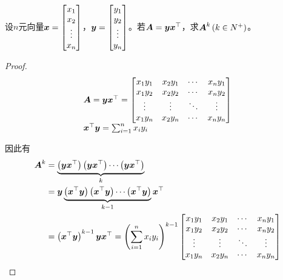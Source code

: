 \begin{problem}\label{problem-1.12}
设\(n\)元向量\(\boldsymbol{x}=\begin{bmatrix}x_1\\x_2\\\vdots\\x_n\end{bmatrix}\)，\(\boldsymbol{y}=\begin{bmatrix}y_1\\y_2\\\vdots\\y_n\end{bmatrix}\)。若\(\boldsymbol{A}=\boldsymbol{y}\boldsymbol{x}^\top\)，求\(\boldsymbol{A}^k\left( k \in N^+ \right)\)。
\end{problem}
\begin{proof}
    \begin{equation*}
        \begin{array}{lll}
            \boldsymbol{A}=\boldsymbol{y}\boldsymbol{x}^\top=
            \begin{bmatrix}
                x_1y_1 & x_2y_1 & \cdots & x_ny_1 \\
                x_1y_2 & x_2y_2 & \cdots & x_ny_2 \\
                \vdots & \vdots & \ddots & \vdots \\
                x_1y_n & x_2y_n & \cdots & x_ny_n \\
            \end{bmatrix}  \\
            \boldsymbol{x}^\top\boldsymbol{y}=\sum_{i=1}^nx_iy_i \\
        \end{array}
    \end{equation*}

    因此有
    \begin{align*}
        \boldsymbol{A}^k & =\underbrace{\left( \boldsymbol{y}\boldsymbol{x}^\top \right)\left( \boldsymbol{y}\boldsymbol{x}^\top \right)\cdots\left( \boldsymbol{y}\boldsymbol{x}^\top \right)}_k                    \\
                & =\boldsymbol{y}\underbrace{\left( \boldsymbol{x}^\top\boldsymbol{y} \right)\left( \boldsymbol{x}^\top\boldsymbol{y} \right)\cdots\left( \boldsymbol{x}^\top\boldsymbol{y} \right)}_{k-1}\boldsymbol{x}^\top \\
                & =\left( \boldsymbol{x}^\top\boldsymbol{y} \right)^{k-1}\boldsymbol{y}\boldsymbol{x}^\top=\left( \sum_{i=1}^nx_iy_i \right)^{k-1}
        \begin{bmatrix}
            x_1y_1 & x_2y_1 & \cdots & x_ny_1 \\
            x_1y_2 & x_2y_2 & \cdots & x_ny_2 \\
            \vdots & \vdots & \ddots & \vdots \\
            x_1y_n & x_2y_n & \cdots & x_ny_n \\
        \end{bmatrix}
    \end{align*}
\end{proof}

